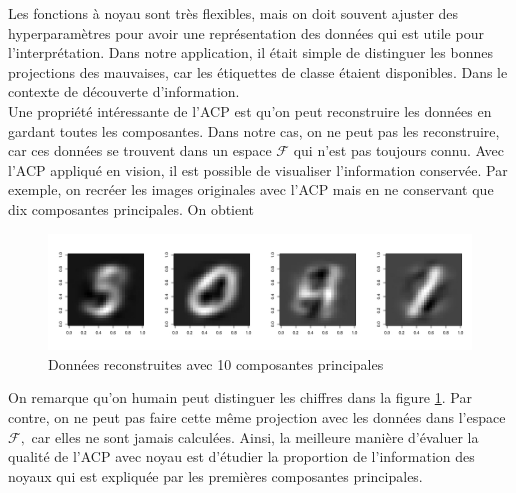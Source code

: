 Les fonctions à noyau sont très flexibles, mais on doit souvent ajuster des hyperparamètres pour avoir une représentation des données qui est utile pour l'interprétation. Dans notre application, il était simple de distinguer les bonnes projections des mauvaises, car les étiquettes de classe étaient disponibles. Dans le contexte de découverte d'information.\\

Une propriété intéressante de l'ACP est qu'on peut reconstruire les données en gardant toutes les composantes. Dans notre cas, on ne peut pas les reconstruire, car ces données se trouvent dans un espace $\mathcal{F}$ qui n'est pas toujours connu. Avec l'ACP appliqué en vision, il est possible de visualiser l'information conservée. Par exemple, on recréer les images originales avec l'ACP mais en ne conservant que dix composantes principales. On obtient 

\begin{figure}[H]
	\includegraphics[width=\textwidth]{reconstruction}
	\caption{Données reconstruites avec 10 composantes principales}
	\label{fig:reconstruit}
\end{figure}

On remarque qu'on humain peut distinguer les chiffres dans la figure \ref{fig:reconstruit}. Par contre, on ne peut pas faire cette même projection avec les données dans l'espace $\mathcal{F},$ car elles ne sont jamais calculées. Ainsi, la meilleure manière d'évaluer la qualité de l'ACP avec noyau est d'étudier la proportion de l'information des noyaux qui est expliquée par les premières composantes principales. 
